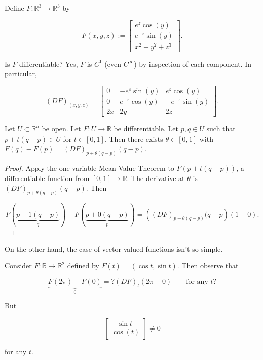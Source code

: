 \begin{example}

Define \(F: \mathbb{R}^3 \to \mathbb{R}^3\) by 

\[
F(x,y,z) := \begin{bmatrix} e^z \cos (y) \\ e^{-z} \sin(y) \\ x^2 + y^2 + z^3 \end{bmatrix}. 
\]

Is \(F\) differentiable? Yes, \(F\) is \(C^1\) (even \(C^\infty\)) by inspection of each component. In particular,

\[
(DF)_{(x,y,z)} = \begin{bmatrix}
0 & -e^z \sin(y) & e^z \cos(y) \\
0 & e^{-z} \cos(y) & -e^{-z} \sin(y) \\
2x & 2y & 2z
\end{bmatrix}.
\]

\end{example}

\begin{theorem}

Let \(U \subset \mathbb{R}^n\) be open. Let \(F: U \to \mathbb{R}\) be differentiable. Let \(p, q \in U\) such that \(p + t(q-p) \in U\) for \(t \in [0,1]\). Then there exists \(\theta \in [0,1]\) with \(F(q) -F(p) = (DF)_{p + \theta (q-p)} (q-p)\).

\end{theorem}

\begin{proof}

Apply the one-variable Mean Value Theorem to \(F(p + t(q-p))\), a differentiable function from \([0,1] \to \mathbb{R}\). The derivative at \(\theta\) is \((DF)_{p+\theta(q-p)}(q-p)\). Then

\[
F(\underbrace{p+1 (q-p)}_{q}) - F(\underbrace{p + 0(q-p)}_{p}) = \left((DF)_{p+\theta(q-p)}(q-p \right)(1-0).
\]

\end{proof}

On the other hand, the case of vector-valued functions isn't so simple.

\begin{example}

Consider \(F: \mathbb{R} \to \mathbb{R}^2\) defined by \(F(t) = (\cos t, \sin t)\). Then observe that 

\[
\underbrace{F(2\pi) - F(0)}_0 =? (DF)_t(2\pi -0) \qquad \text{for any } t?
\]

But

\[
\begin{bmatrix} 
- \sin t \\
\cos (t)
\end{bmatrix} \neq 0
\]

for any \(t\).

\end{example}

